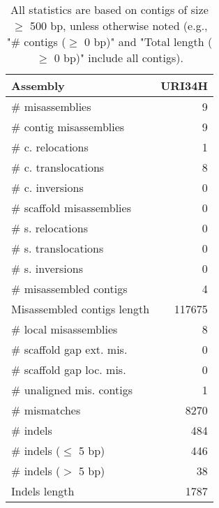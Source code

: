 \documentclass[12pt,a4paper]{article}
\begin{document}
\begin{table}[ht]
\begin{center}
\caption{All statistics are based on contigs of size $\geq$ 500 bp, unless otherwise noted (e.g., "\# contigs ($\geq$ 0 bp)" and "Total length ($\geq$ 0 bp)" include all contigs).}
\begin{tabular}{|l*{1}{|r}|}
\hline
Assembly & URI34H \\ \hline
\# misassemblies & 9 \\ \hline
\hspace{2mm}\# contig misassemblies & 9 \\ \hline
\hspace{5mm}\# c. relocations & 1 \\ \hline
\hspace{5mm}\# c. translocations & 8 \\ \hline
\hspace{5mm}\# c. inversions & 0 \\ \hline
\hspace{2mm}\# scaffold misassemblies & 0 \\ \hline
\hspace{5mm}\# s. relocations & 0 \\ \hline
\hspace{5mm}\# s. translocations & 0 \\ \hline
\hspace{5mm}\# s. inversions & 0 \\ \hline
\# misassembled contigs & 4 \\ \hline
Misassembled contigs length & 117675 \\ \hline
\# local misassemblies & 8 \\ \hline
\# scaffold gap ext. mis. & 0 \\ \hline
\# scaffold gap loc. mis. & 0 \\ \hline
\# unaligned mis. contigs & 1 \\ \hline
\# mismatches & 8270 \\ \hline
\# indels & 484 \\ \hline
\hspace{5mm}\# indels ($\leq$ 5 bp) & 446 \\ \hline
\hspace{5mm}\# indels ($>$ 5 bp) & 38 \\ \hline
Indels length & 1787 \\ \hline
\end{tabular}
\end{center}
\end{table}
\end{document}
